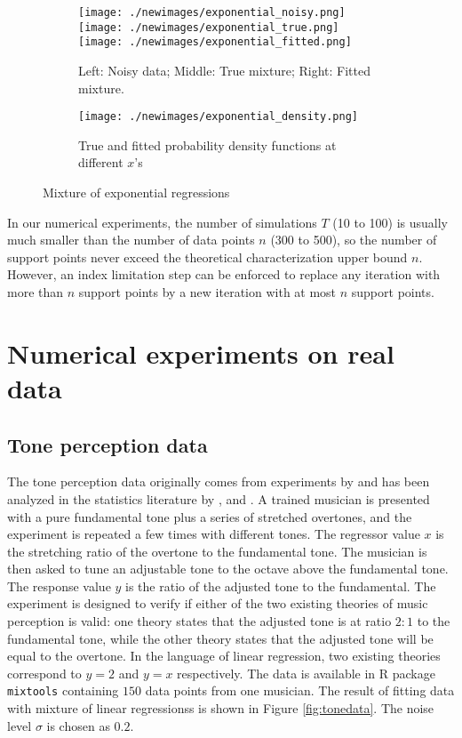 \documentclass[11pt]{article}
\numberwithin{equation}{section}
\begin{document}
\begin{figure}[!htbp]
\begin{subfigure}[b]{\textwidth}
\texttt{[image: ./newimages/exponential\_noisy.png]}
\texttt{[image: ./newimages/exponential\_true.png]}
\texttt{[image: ./newimages/exponential\_fitted.png]}
\caption{Left: Noisy data; Middle: True mixture; Right: Fitted mixture.}
\end{subfigure}

\begin{subfigure}[b]{\textwidth}
\texttt{[image: ./newimages/exponential\_density.png]}
\caption{True and fitted probability density functions at different $x$'s }
\end{subfigure}
\caption{Mixture of exponential regressions}
\label{fig:exponential}
\end{figure}

In our numerical experiments, the number of simulations $T$ (10 to 100) is usually much smaller than the number of data points $n$ (300 to 500), so the number of support points never exceed the theoretical characterization upper bound $n$. However, an index limitation step \citep[Section 4.2]{mallet1986maximum} can be enforced to replace any iteration with more than $n$ support points by a new iteration with at most $n$ support points.




\section{Numerical experiments on real data}
\label{section:realdata}

\subsection{Tone perception data}

The tone perception data originally comes from experiments by \citet{cohen1980inharmonic} and has been analyzed in the statistics literature by \citet{de1989mixtures}, \citet{viele2002modeling} and \citet{yao2015mixtures}. A trained musician is presented with a pure fundamental tone plus a series of stretched overtones, and the experiment is repeated a few times with different tones. The regressor value $x$ is the stretching ratio of the overtone to the fundamental tone. The musician is then asked to tune an adjustable tone to the octave above the fundamental tone. The response value $y$ is the ratio of the adjusted tone to the fundamental. The experiment is designed to verify if either of the two existing theories of music perception is valid: one theory states that the adjusted tone is at ratio $2:1$ to the fundamental tone, while the other theory states that the adjusted tone will be equal to the overtone. In the language of linear regression, two existing theories correspond to $y = 2$ and $y = x$ respectively. The data is available in R package \texttt{mixtools} \citep{R} containing $150$ data points from one musician. The result of fitting data with mixture of linear regressionss is shown in Figure \ref{fig:tonedata}. The noise level $\sigma$ is chosen as $0.2$.
\end{document}
